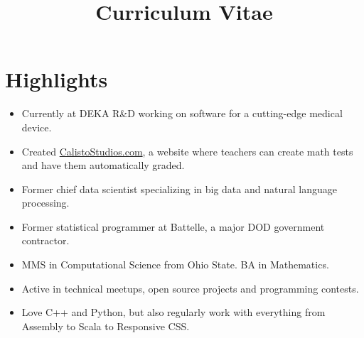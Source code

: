 \documentclass[11pt,a4paper,sans]{moderncv} %
\title{Curriculum Vitae}
\begin{document}
\makecvtitle %

\section{Highlights}
\begin{itemize}
\item Currently at DEKA R\&D working on software for a cutting-edge medical device.
\item Created \url{CalistoStudios.com}, a website where teachers can create math tests and have them automatically graded.
\item Former chief data scientist specializing in big data and natural language processing.
\item Former statistical programmer at Battelle, a major DOD government contractor.
\item MMS in Computational Science from Ohio State. BA in Mathematics.
\item Active in technical meetups, open source projects and programming contests.
\item Love C++ and Python, but also regularly work with everything from Assembly to Scala to Responsive CSS.
\end{itemize}
\end{document}
